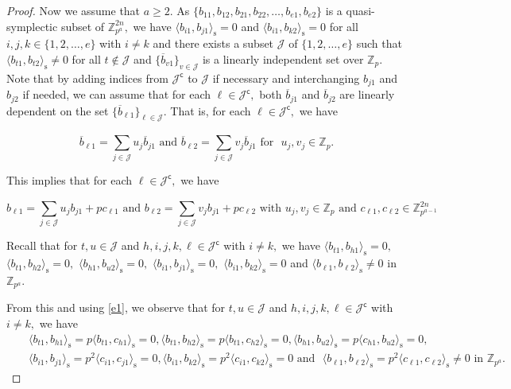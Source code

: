 \documentclass{article}
\theoremstyle{remark}
\theoremstyle{definition}
\numberwithin{equation}{section}
\begin{document}
\begin{proof}
Now we assume that $a\geq 2.$ As $\{b_{11},b_{12},b_{21},b_{22},\ldots,b_{e1},b_{e2}\}$
is a quasi-symplectic subset of ${\mathbb{Z}^{2n}_{p^a}},$  we have $\langle b_{i1}, b_{j1} \rangle_{\mathrm{s}}=0$ and $\langle b_{i1}, b_{k 2} \rangle_{\mathrm{s}}=0$ for all $i ,j, k  \in \{1,2,\ldots,e\}$ with $i \neq k$ and there exists a subset $\mathcal{J}$ of $\{1,2,\ldots,e \}$ such that $\langle b_{t1}, b_{t2} \rangle_{\mathrm{s}}\neq0$ for all $ t \not\in \mathcal{J}$ and $\{\overline{b}_{v1} \}_{v \in \mathcal{J}}$ is a linearly independent set over $\mathbb{Z}_p.$ 
 Note that by adding indices from $\mathcal{J}^\mathsf{c}$ to $\mathcal{J}$ if necessary and interchanging $b_{j1}$ and $b_{j2}$ if needed, we can assume that for each $\ell \in \mathcal{J}^\mathsf{c},$
 both $\overline{b}_{j1}$ and $\overline{b}_{j2}$ are linearly dependent on the set $\{\overline{b}_{\ell 1}\}_{\ell \in \mathcal{J}}.$ That is, for each $\ell \in \mathcal{J}^\mathsf{c},$ we have

$$\overline{b}_{\ell 1}=\sum\limits_{ j \in \mathcal{J}}^{}  u_j \overline{b}_{j 1} \text{~and~} \overline{b}_{\ell 2}=\sum\limits_{ j \in \mathcal{J}}^{}  v_j \overline{b}_{j 1} \text{~for ~} u_j, v_j \in \mathbb{Z}_p.$$

This implies that for each $\ell \in \mathcal{J}^\mathsf{c},$ we have

\begin{equation}\label{e1}
b_{\ell 1}=\sum\limits_{ j \in \mathcal{J}}^{}  u_j b_{j 1}+pc_{\ell 1} \text{~and~} {b}_{\ell 2}=\sum\limits_{ j \in \mathcal{J}}^{}  v_j b_{j 1}+pc_{\ell 2} \text{~with~} u_j, v_j \in \mathbb{Z}_p \text{~and~} c_{\ell 1}, c_{\ell 2} \in \mathbb{Z}_{p^{a-1}}^{2n} \end{equation}

Recall that for $t, u \in \mathcal{J}$ and $h,i,j,k,\ell \in \mathcal{J}^\mathsf{c}$ with $i \neq k,$ 
we have $\langle b_{t1}, b_{h1}\rangle_{\mathrm{s}} =0,$  $\langle b_{t1}, b_{h2}\rangle_{\mathrm{s}} =0,$ $\langle b_{h1}, b_{u2}\rangle_{\mathrm{s}}=0,$ $\langle b_{i1}, b_{j1}\rangle_{\mathrm{s}}=0,$ $\langle b_{i1}, b_{k2}\rangle_{\mathrm{s}} =0$ and $ \langle b_{\ell1}, b_{\ell2}\rangle_{\mathrm{s}} \neq 0$ in $\mathbb{Z}_{p^{a}}.$

 From this and using \eqref{e1}, we observe that for $t, u \in \mathcal{J}$ and $h,i,j,k,\ell \in \mathcal{J}^\mathsf{c}$ with $i \neq k,$ we have
 \begin{eqnarray}\label{e2}
 &&    \langle b_{t1}, b_{h1}\rangle_{\mathrm{s}} =p\langle b_{t1},  c_{h1}\rangle_{\mathrm{s}} =0,    \langle b_{t1}, b_{h2}\rangle_{\mathrm{s}} =p\langle b_{t1},  c_{h2}\rangle_{\mathrm{s}} =0, \langle b_{h1}, b_{u2}\rangle_{\mathrm{s}} =p\langle c_{h1},  b_{u2}\rangle_{\mathrm{s}} = 0, 
 \nonumber\\ &&
\langle b_{i1}, b_{j1}\rangle_{\mathrm{s}} =p^2\langle c_{i1},  c_{j1}\rangle_{\mathrm{s}} = 0,   \langle b_{i1}, b_{k2}\rangle_{\mathrm{s}} =p^2\langle c_{i1},  c_{k2}\rangle_{\mathrm{s}} = 0
  \text{~and ~} 
 \langle b_{\ell1}, b_{\ell2}\rangle_{\mathrm{s}} =p^2\langle c_{\ell1},  c_{\ell2}\rangle_{\mathrm{s}} \neq 0  \text{~in~} \mathbb{Z}_{p^{a}}. ~ \end{eqnarray} 
 

\end{proof}
\end{document}
